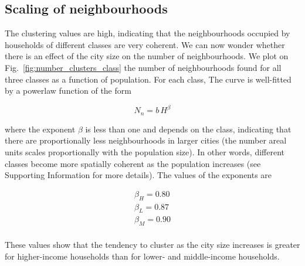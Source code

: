  \subsection{Scaling of neighbourhoods}
       \label{ssub:dependence_on_city_size}
       
The clustering values are high, indicating that the neighbourhoods occupied by
households of different classes are very coherent. We can now wonder whether
there is an effect of the city size on the number of neighbourhoods. We plot on
Fig.~\ref{fig:number_clusters_class} the number of neighbourhoods found for all
three classes as a function of population. For each class, The curve is
well-fitted by a powerlaw function of the form

\begin{equation}
    N_n = b\,H^\beta
\end{equation}

where the exponent $\beta$ is less than one and depends on the class, 
indicating that there are proportionally less neighbourhoods
in larger cities (the number areal units scales proportionally with the
population size). In other words, different classes become more spatially
coherent as the population increases (see Supporting Information for more
details). The values of the exponents are

\begin{align*}
    \beta_{H} = 0.80\\
    \beta_{L} = 0.87\\
    \beta_{M} = 0.90\\
\end{align*}

These values show that the tendency to cluster as the city size increases is greater
for higher-income households than for lower- and middle-income households.\\




